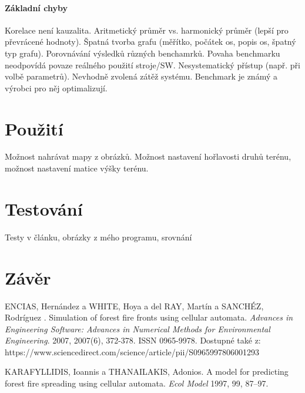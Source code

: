 \documentclass[11pt,a4paper]{scrartcl}
\begin{document}
	
	\paragraph{Základní chyby} Korelace není kauzalita. Aritmetický průměr vs. harmonický průměr (lepší pro převrácené hodnoty). Špatná tvorba grafu (měřítko, počátek os, popis os, špatný typ grafu). Porovnávání výsledků různých benchamrků. Povaha benchmarku neodpovídá povaze reálného použití stroje/SW. Nesystematický přístup (např. při volbě parametrů). Nevhodně zvolená zátěž systému. Benchmark je známý a výrobci pro něj optimalizují.
	
	\section{Použití}
	Možnost nahrávat mapy z obrázků. Možnost nastavení hořlavosti druhů terénu, možnost nastavení matice výšky terénu.
	
	\section{Testování}
	Testy v článku, obrázky z mého programu, srovnání
	
	\section{Závěr}
	
	\begin{thebibliography}{9}
		
		ENCIAS, Hernández a WHITE, Hoya a del RAY, Martín a SANCHÉZ, Rodríguez . Simulation of forest fire fronts using cellular automata. \textit{Advances in Engineering Software: Advances in Numerical Methods for Environmental Engineering}. 2007, 2007(6), 372-378. ISSN 0965-9978. Dostupné také z: https://www.sciencedirect.com/science/article/pii/S0965997806001293
		
		KARAFYLLIDIS, Ioannis a THANAILAKIS, Adonios. A model for predicting forest fire spreading using cellular automata. \textit{Ecol Model} 1997, 99, 87–97.
	\end{thebibliography}
	
\end{document}
